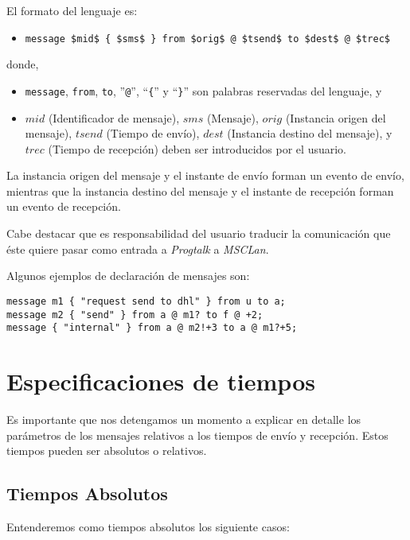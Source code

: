 El formato del lenguaje es:

\begin{itemize}
\item \lstinline[mathescape]!message $mid$ { $sms$ } from $orig$ @ $tsend$ to $dest$ @ $trec$!
\end{itemize}

donde,
\begin{itemize}
\item \lstinline{message}, \lstinline{from}, \lstinline{to},
  ''\lstinline{@}'', ``\lstinline!{!'' y ``\lstinline!}!'' son
  palabras reservadas del lenguaje, y
\item $mid$ (Identificador de mensaje), $sms$ (Mensaje), $orig$
  (Instancia origen del mensaje), $tsend$ (Tiempo de envío), $dest$
  (Instancia destino del mensaje), y $trec$ (Tiempo de recepción)
  deben ser introducidos por el usuario.
\end{itemize}

La instancia origen del mensaje y el instante de envío forman un
evento de envío, mientras que la instancia destino del mensaje y el
instante de recepción forman un evento de recepción.

Cabe destacar que es responsabilidad del usuario traducir la
comunicación que éste quiere pasar como entrada a \textit{Progtalk} a
\textit{MSCLan}.

Algunos ejemplos de declaración de mensajes son:

\begin{lstlisting}
message m1 { "request send to dhl" } from u to a;
message m2 { "send" } from a @ m1? to f @ +2;
message { "internal" } from a @ m2!+3 to a @ m1?+5;
\end{lstlisting}

\section{Especificaciones de tiempos}

Es importante que nos detengamos un momento a explicar en detalle los
parámetros de los mensajes relativos a los tiempos de envío y
recepción. Estos tiempos pueden ser absolutos o relativos.

\subsection{Tiempos Absolutos}

Entenderemos como tiempos absolutos los siguiente casos:

